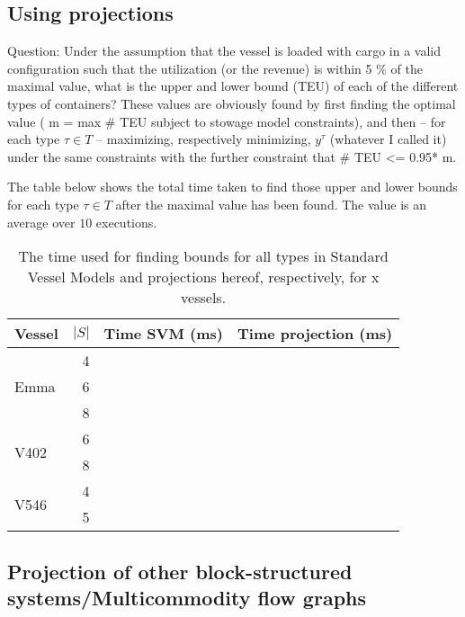   

\subsection*{Using projections}
Question: Under the assumption that the vessel is loaded with cargo in a valid configuration such that the utilization (or the revenue) is within 5 \% of the maximal value, what is the upper and lower bound (TEU) of each of the different types of containers?
These values are obviously found by first finding the optimal value ( m = max \# TEU subject to stowage model constraints),
and then -- for each type $\tau\in T$ -- maximizing, respectively minimizing, $y^\tau$ (whatever I called it) under the same constraints with the further constraint that \# TEU <= 0.95* m.  

The table below shows the total time taken to find those upper and lower bounds for each type $\tau\in T$ after the maximal value has been found. The value is an average over $10$ executions. 

\begin{table}
\centering
\begin{tabular}{lr|r|r}
\toprule
Vessel&$|S|$&Time SVM (ms)&Time projection (ms)\\
\midrule
\multirow{3}{*}{Emma}& 4&&\\
&6&&\\
&8&&\\
\midrule
\multirow{2}{*}{V402}&6&\\
&8&\\
\midrule
\multirow{2}{*}{V546}&4&\\
&5&\\
\bottomrule
\end{tabular}
\caption{The time used for finding bounds for all types in Standard Vessel Models and projections hereof, respectively, for x vessels. }
\label{tab:usingProjections}
\end{table}

\subsection*{Projection of other block-structured systems/Multicommodity flow graphs} 


